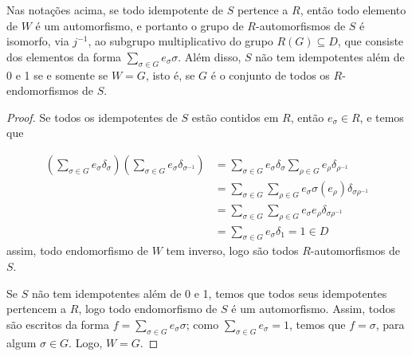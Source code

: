 \begin{corol}
Nas notações acima, se todo idempotente de $S$ pertence a $R$, então todo elemento de $W$ é um automorfismo, e portanto o grupo de $R$-automorfismos de $S$ é isomorfo, via $j^{-1}$, ao subgrupo multiplicativo do grupo $R(G)\subseteq D$, que consiste dos elementos da forma $\sum_{\sigma\in G}e_\sigma \sigma$. Além disso, $S$ não tem idempotentes além de 0 e 1 se e somente se $W = G$, isto é, se $G$ é o conjunto de todos os $R$-endomorfismos de $S$.
\begin{proof}
Se todos os idempotentes de $S$ estão contidos em $R$, então $e_\sigma \in R$, e temos que

\begin{align*}
    \left( \sum_{\sigma \in G} e_\sigma \delta_{\sigma} \right) \left(\sum_{\sigma \in G} e_\sigma \delta_{\sigma^{-1}} \right) & = \sum_{\sigma \in G} e_\sigma \delta_\sigma \sum_{\rho \in G} e_\rho \delta_{\rho^{-1}} \\
    &= \sum_{\sigma \in G} \sum_{\rho \in G} e_\sigma \sigma(e_\rho) \delta_{\sigma \rho^{-1}} \\
    &= \sum_{\sigma\in G}\sum_{\rho \in G} e_\sigma e_\rho \delta_{\sigma \rho^{-1}} \\
    &= \sum_{\sigma \in G} e_{\sigma} \delta_{1} = 1 \in D
\end{align*}
assim, todo endomorfismo de $W$ tem inverso, logo são todos $R$-automorfismos de $S$. 

Se $S$ não tem idempotentes além de 0 e 1, temos que todos seus idempotentes pertencem a $R$, logo todo endomorfismo de $S$ é um automorfismo. Assim, todos são escritos da forma $f=\sum_{\sigma \in G}e_\sigma \sigma$; como $\sum_{\sigma \in G} e_\sigma =1$, temos que $f=\sigma$, para algum $\sigma \in G$. Logo, $W =G$.
\end{proof}
\end{corol}

